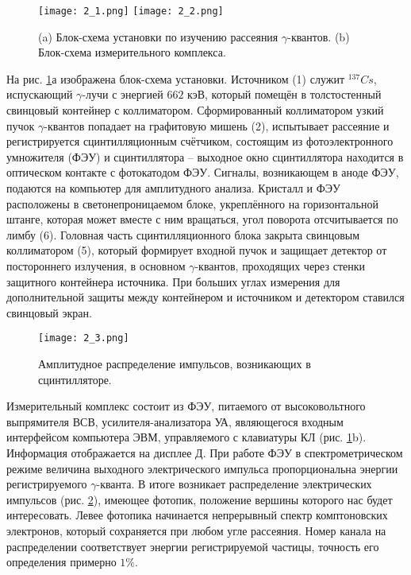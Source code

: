 \begin{figure}[h]
  \texttt{[image: 2\_1.png]}
  \texttt{[image: 2\_2.png]}
  \centering
  \caption{(a) Блок-схема установки по изучению рассеяния $\gamma$-квантов. (b) Блок-схема измерительного комплекса.}
  \label{Device}
\end{figure}

На рис. \ref{Device}а изображена блок-схема установки. Источником (1) служит
${}^{137}Cs$, испускающий $\gamma$-лучи с энергией $662$ кэВ, который помещён в
толстостенный свинцовый контейнер с коллиматором. Сформированный коллиматором
узкий пучок $\gamma$-квантов попадает на графитовую мишень (2), испытывает
рассеяние и регистрируется сцинтилляционным счётчиком, состоящим из
фотоэлектронного умножителя (ФЭУ) и сцинтиллятора -- выходное окно сцинтиллятора
находится в оптическом контакте с фотокатодом ФЭУ. Сигналы, возникающем в аноде
ФЭУ, подаются на компьютер для амплитудного анализа. Кристалл и ФЭУ расположены
в светонепроницаемом блоке, укреплённого на горизонтальной штанге, которая может
вместе с ним вращаться, угол поворота отсчитывается по лимбу (6). Головная часть
сцинтилляционного блока закрыта свинцовым коллиматором (5), который формирует
входной пучок и защищает детектор от постороннего излучения, в основном
$\gamma$-квантов, проходящих через стенки защитного контейнера источника. При
больших углах измерения для дополнительной защиты между контейнером и источником
и детектором ставился свинцовый экран.

\begin{figure}[h]
  \texttt{[image: 2\_3.png]}
  \centering
  \caption{Амплитудное распределение импульсов, возникающих в сцинтилляторе.}
  \label{Channel}
\end{figure}

Измерительный комплекс состоит из ФЭУ, питаемого от высоковольтного выпрямителя
ВСВ, усилителя-анализатора УА, являющегося входным интерфейсом компьютера ЭВМ,
управляемого с клавиатуры КЛ (рис. \ref{Device}b). Информация отображается на
дисплее Д. При работе ФЭУ в спектрометрическом режиме величина выходного
электрического импульса пропорциональна энергии регистрируемого $\gamma$-кванта.
В итоге возникает распределение электрических импульсов (рис. \ref{Channel}),
имеющее фотопик, положение вершины которого нас будет интересовать. Левее
фотопика начинается непрерывный спектр комптоновских электронов, который
сохраняется при любом угле рассеяния. Номер канала на распределении
соответствует энергии регистрируемой частицы, точность его определения примерно
$1\%$.


